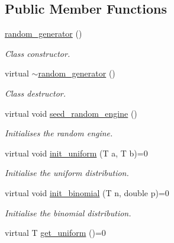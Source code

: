 \subsection*{Public Member Functions}
\begin{DoxyCompactItemize}
\item 
\hyperlink{classlgraph_1_1utils_1_1random__generator_af4f4ba363f6f72d3ded2dba9e97079bb}{random\+\_\+generator} ()\hypertarget{classlgraph_1_1utils_1_1random__generator_af4f4ba363f6f72d3ded2dba9e97079bb}{}\label{classlgraph_1_1utils_1_1random__generator_af4f4ba363f6f72d3ded2dba9e97079bb}

\begin{DoxyCompactList}\small\item\em Class constructor. \end{DoxyCompactList}\item 
virtual \hyperlink{classlgraph_1_1utils_1_1random__generator_a87783727d9e3a109bc3ed0631edad69b}{$\sim$random\+\_\+generator} ()\hypertarget{classlgraph_1_1utils_1_1random__generator_a87783727d9e3a109bc3ed0631edad69b}{}\label{classlgraph_1_1utils_1_1random__generator_a87783727d9e3a109bc3ed0631edad69b}

\begin{DoxyCompactList}\small\item\em Class destructor. \end{DoxyCompactList}\item 
virtual void \hyperlink{classlgraph_1_1utils_1_1random__generator_a4eb6998070eecb59bd89dca92d8a509c}{seed\+\_\+random\+\_\+engine} ()\hypertarget{classlgraph_1_1utils_1_1random__generator_a4eb6998070eecb59bd89dca92d8a509c}{}\label{classlgraph_1_1utils_1_1random__generator_a4eb6998070eecb59bd89dca92d8a509c}

\begin{DoxyCompactList}\small\item\em Initialises the random engine. \end{DoxyCompactList}\item 
virtual void \hyperlink{classlgraph_1_1utils_1_1random__generator_a129da597bed5b08e9c7e5a3ddce4287c}{init\+\_\+uniform} (T a, T b)=0
\begin{DoxyCompactList}\small\item\em Initialise the uniform distribution. \end{DoxyCompactList}\item 
virtual void \hyperlink{classlgraph_1_1utils_1_1random__generator_a71976e6ecbbd49de85ac270085832df1}{init\+\_\+binomial} (T n, double p)=0
\begin{DoxyCompactList}\small\item\em Initialise the binomial distribution. \end{DoxyCompactList}\item 
virtual T \hyperlink{classlgraph_1_1utils_1_1random__generator_ac18bd12c8baf8a7cbe6ef9be072c95cf}{get\+\_\+uniform} ()=0\hypertarget{classlgraph_1_1utils_1_1random__generator_ac18bd12c8baf8a7cbe6ef9be072c95cf}{}\label{classlgraph_1_1utils_1_1random__generator_ac18bd12c8baf8a7cbe6ef9be072c95cf}


\end{DoxyCompactItemize}
